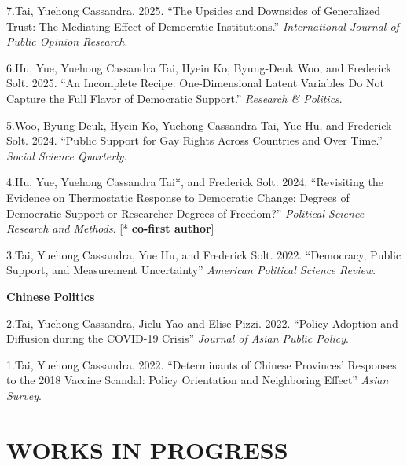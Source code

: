 \documentclass[10.5pt,]{article}
\providecommand{\tightlist}{%
	\setlength{\itemsep}{0pt}\setlength{\parskip}{0pt}}
\renewenvironment{itemize}{
	\begin{list}{}{
			\setlength{\leftmargin}{1.5em}
		}
	}{
	\end{list}
}
\begin{document}
\begin{itemize}
  \begin{itemize}
  \tightlist
  \item
    7.Tai, Yuehong Cassandra. 2025. ``The Upsides and Downsides of
    Generalized Trust: The Mediating Effect of Democratic
    Institutions.'' \emph{International Journal of Public Opinion
    Research}.
  \item
    6.Hu, Yue, Yuehong Cassandra Tai, Hyein Ko, Byung-Deuk Woo, and
    Frederick Solt. 2025. ``An Incomplete Recipe: One-Dimensional Latent
    Variables Do Not Capture the Full Flavor of Democratic Support.''
    \emph{Research \& Politics}.
  \item
    5.Woo, Byung-Deuk, Hyein Ko, Yuehong Cassandra Tai, Yue Hu, and
    Frederick Solt. 2024. ``Public Support for Gay Rights Across
    Countries and Over Time.'' \emph{Social Science Quarterly}.
  \item
    4.Hu, Yue, Yuehong Cassandra Tai*, and Frederick Solt. 2024.
    ``Revisiting the Evidence on Thermostatic Response to Democratic
    Change: Degrees of Democratic Support or Researcher Degrees of
    Freedom?'' \emph{Political Science Research and Methods}. {[}*
    \textbf{co-first author}{]}
  \item
    3.Tai, Yuehong Cassandra, Yue Hu, and Frederick Solt. 2022.
    ``Democracy, Public Support, and Measurement Uncertainty''
    \emph{American Political Science Review}.
  \end{itemize}
\item
  \textbf{Chinese Politics}

  \begin{itemize}
  \tightlist
  \item
    2.Tai, Yuehong Cassandra, Jielu Yao and Elise Pizzi. 2022. ``Policy
    Adoption and Diffusion during the COVID-19 Crisis'' \emph{Journal of
    Asian Public Policy}.
  \item
    1.Tai, Yuehong Cassandra. 2022. ``Determinants of Chinese Provinces'
    Responses to the 2018 Vaccine Scandal: Policy Orientation and
    Neighboring Effect'' \emph{Asian Survey}.
  \end{itemize}
\end{itemize}

\section{WORKS IN PROGRESS}\label{works-in-progress}
\end{document}
